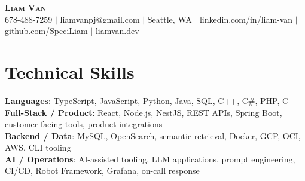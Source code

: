 \documentclass[letterpaper,11pt]{article}
\begin{document}

%
\begin{center}
    \textbf{\Huge \scshape Liam Van} \\ \vspace{1pt}
    \small 678-488-7259 $|$ \small {liamvanpj@gmail.com} $|$ Seattle, WA
 {{$|$ linkedin.com/in/liam-van} {$|$ github.com/SpeciLiam} {$|$ \href{https://liamvan.dev}{liamvan.dev}}}

\end{center}

\section{Technical Skills}
 \begin{itemize}[leftmargin=0.15in, label={}]
    \small{\item{
     \textbf{Languages}{: TypeScript, JavaScript, Python, Java, SQL, C++, C\#, PHP, C} \\
     \textbf{Full-Stack / Product}{: React, Node.js, NestJS, REST APIs, Spring Boot, customer-facing tools, product integrations} \\
     \textbf{Backend / Data}{: MySQL, OpenSearch, semantic retrieval, Docker, GCP, OCI, AWS, CLI tooling} \\
     \textbf{AI / Operations}{: AI-assisted tooling, LLM applications, prompt engineering, CI/CD, Robot Framework, Grafana, on-call response} \\
    }}
 \end{itemize}
%

\end{document}
